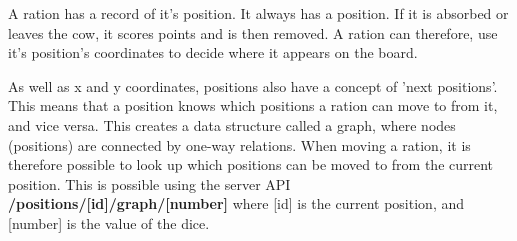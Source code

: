 A ration has a record of it's position. It always has a position. If it is absorbed or leaves the cow, it scores points and is then removed. A ration can therefore, use it's position's coordinates to decide where it appears on the board.

\begin{center}
\end{center}

As well as x and y coordinates, positions also have a concept of 'next positions'. This means that a position knows which positions a ration can move to from it, and vice versa. This creates a data structure called a graph, where nodes (positions) are connected by one-way relations. When moving a ration, it is therefore possible to look up which positions can be moved to from the current position. This is possible using the server API \textbf{/positions/[id]/graph/[number]} where [id] is the current position, and [number] is the value of the dice.

\begin{center}
\end{center}

